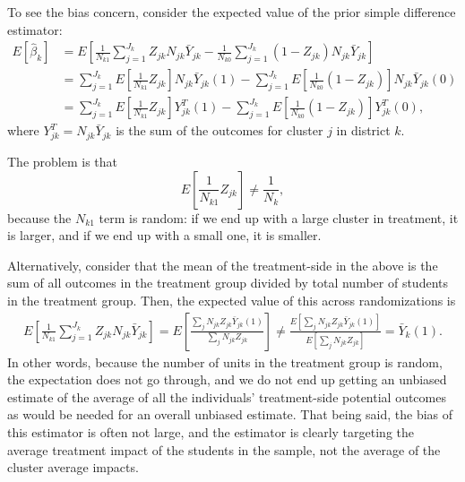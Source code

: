 \documentclass[12pt]{article}
\begin{document}
To see the bias concern, consider the expected value of the prior simple difference estimator:
\begin{align*}
E[ \hat{\beta}_{k} ] &= E \left[ \frac{1}{N_{k1}}  \sum_{j=1}^{J_k} Z_{jk} N_{jk} \bar{Y}_{jk} - \frac{1}{N_{k0}} \sum_{j=1}^{J_k} (1-Z_{jk}) N_{jk}  \bar{Y}_{jk} \right] \\
 &=  \sum_{j=1}^{J_k} E\left[  \frac{1}{N_{k1}} Z_{jk}  \right] N_{jk}  \bar{Y}_{jk}(1) -  \sum_{j=1}^{J_k} E\left[ \frac{1}{N_{k0}} (1-Z_{jk}) \right] N_{jk} \bar{Y}_{jk}(0) \\
 &= \sum_{j=1}^{J_k} E\left[  \frac{1}{N_{k1}} Z_{jk}  \right] Y^T_{jk}(1) -  \sum_{j=1}^{J_k} E\left[ \frac{1}{N_{k0}} (1-Z_{jk}) \right] Y^T_{jk}(0),
\end{align*}
where $Y^T_{jk} = N_{jk} \bar{Y}_{jk}$ is the sum of the outcomes for cluster $j$ in district $k$.

The problem is that
\[
E[  \frac{1}{N_{k1}} Z_{jk} ] \neq \frac{1}{N_k},
\]
because the $N_{k1}$ term is random: if we end up with a large cluster in treatment, it is larger, and if we end up with a small one, it is smaller.

Alternatively, consider that the mean of the treatment-side in the above is the sum of all outcomes in the treatment group divided by total number of students in the treatment group.
Then, the expected value of this across randomizations is
\begin{align*}
 E\left[ \frac{1}{N_{k1}}  \sum_{j=1}^{J_k} Z_{jk} N_{jk} \bar{Y}_{jk}  \right] = E\left[ \frac{ \sum_{j} N_{jk} Z_{jk} \bar{Y}_{jk}(1) }{ \sum_{j} N_{jk} Z_{jk} } \right] \neq   \frac{ E\left[ \sum_{j} N_{jk} Z_{jk} \bar{Y}_{jk}(1) \right] }{ E\left[ \sum_{j} N_{jk} Z_{jk} \right] }  = \bar{Y}_k(1) .
\end{align*}
In other words, because the number of units in the treatment group is random, the expectation does not go through, and we do not end up getting an unbiased estimate of the average of all the individuals' treatment-side potential outcomes as would be needed for an overall unbiased estimate.
That being said, the bias of this estimator is often not large, and the estimator is clearly targeting the average treatment impact of the students in the sample, not the average of the cluster average impacts.
\end{document}
